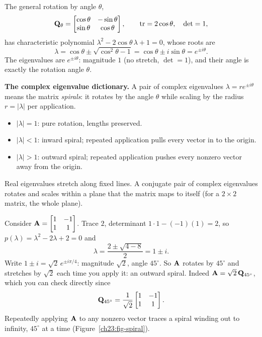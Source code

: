The general rotation by angle $\theta$,
\[
  \mathbf{Q}_\theta=\begin{bmatrix}\cos\theta & -\sin\theta\\ \sin\theta & \cos\theta\end{bmatrix},
  \qquad
  \operatorname{tr}=2\cos\theta,\quad \det=1,
\]
has characteristic polynomial $\lambda^2-2\cos\theta\,\lambda+1=0$, whose roots are
\[
  \lambda=\cos\theta\pm\sqrt{\cos^2\theta-1}=\cos\theta\pm i\sin\theta
  =e^{\pm i\theta}.
\]
The eigenvalues are $e^{\pm i\theta}$: magnitude $1$ (no stretch, $\det=1$), and
their angle is exactly the rotation angle $\theta$.

\begin{focusbox}
\textbf{The complex eigenvalue dictionary.} A pair of complex eigenvalues
$\lambda=r e^{\pm i\theta}$ means the matrix \emph{spirals}: it rotates by the
angle $\theta$ while scaling by the radius $r=|\lambda|$ per application.
\begin{itemize}
  \item $|\lambda|=1$: pure rotation, lengths preserved.
  \item $|\lambda|<1$: inward spiral; repeated application pulls every vector in
        to the origin.
  \item $|\lambda|>1$: outward spiral; repeated application pushes every nonzero
        vector away from the origin.
\end{itemize}
Real eigenvalues stretch along fixed lines. A conjugate pair of complex eigenvalues
rotates and scales within a plane that the matrix maps to itself (for a
$2\times 2$ matrix, the whole plane).
\end{focusbox}

\begin{example}
\label{ch23:ex-spiral}
Consider $\mathbf{A}=\begin{bmatrix}1 & -1\\ 1 & 1\end{bmatrix}$. Trace $2$,
determinant $1\cdot 1-(-1)(1)=2$, so
$p(\lambda)=\lambda^2-2\lambda+2=0$ and
\[
  \lambda=\frac{2\pm\sqrt{4-8}}{2}=1\pm i.
\]
Write $1\pm i=\sqrt{2}\,e^{\pm i\pi/4}$: magnitude $\sqrt 2$, angle $45^\circ$. So
$\mathbf{A}$ rotates by $45^\circ$ and stretches by $\sqrt2$ each time you apply it:
an outward spiral. Indeed $\mathbf{A}=\sqrt2\,\mathbf{Q}_{45^\circ}$, which you can check
directly since
\[
  \mathbf{Q}_{45^\circ}=\frac{1}{\sqrt2}\begin{bmatrix}1&-1\\1&1\end{bmatrix}.
\]
Repeatedly applying $\mathbf{A}$ to any nonzero vector traces a spiral winding out to
infinity, $45^\circ$ at a time (Figure~\ref{ch23:fig-spiral}).
\end{example}

